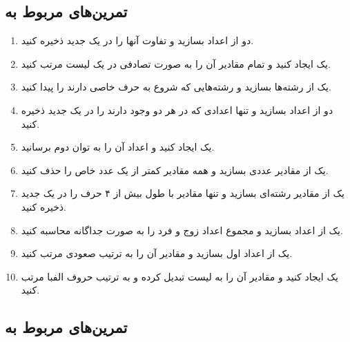 \documentclass[b5paper,12pt]{article}
\begin{document}
	\subsection*{تمرین‌های مربوط به }
	
	\begin{enumerate}
		\item دو  از اعداد بسازید و تفاوت آنها را در یک  جدید ذخیره کنید.
		\item یک  ایجاد کنید و تمام مقادیر آن را به صورت تصادفی در یک لیست مرتب کنید.
		\item یک  از رشته‌ها بسازید و رشته‌هایی که شروع به حرف خاصی دارند را پیدا کنید.
		\item دو  از اعداد بسازید و تنها اعدادی که در هر دو وجود دارند را در یک  جدید ذخیره کنید.
		\item یک  ایجاد کنید و اعداد آن را به توان دوم برسانید.
		\item یک  از مقادیر عددی بسازید و همه مقادیر کمتر از یک عدد خاص را حذف کنید.
		\item یک  از مقادیر رشته‌ای بسازید و تنها مقادیر با طول بیش از ۴ حرف را در یک  جدید ذخیره کنید.
		\item یک  از اعداد بسازید و مجموع اعداد زوج و فرد را به صورت جداگانه محاسبه کنید.
		\item یک  از اعداد اول بسازید و مقادیر آن را به ترتیب صعودی مرتب کنید.
		\item یک  ایجاد کنید و مقادیر آن را به لیست تبدیل کرده و به ترتیب حروف الفبا مرتب کنید.
	\end{enumerate}
	
	\subsection*{تمرین‌های مربوط به }
	
\end{document}
